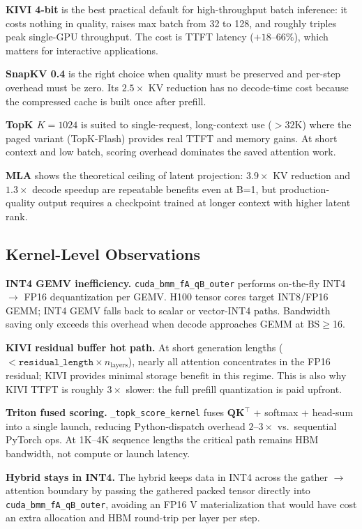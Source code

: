 \documentclass[conference]{IEEEtran}
\begin{document}
\textbf{KIVI 4-bit} is the best practical default for high-throughput
batch inference: it costs nothing in quality, raises max batch from 32
to 128, and roughly triples peak single-GPU throughput.  The cost is
TTFT latency ($+18$--$66\%$), which matters for interactive
applications.

\textbf{SnapKV 0.4} is the right choice when quality must be preserved
and per-step overhead must be zero.  Its $2.5\times$ KV reduction has
no decode-time cost because the compressed cache is built once after
prefill.

\textbf{TopK $K\!=\!1024$} is suited to single-request, long-context
use ($>32$K) where the paged variant (TopK-Flash) provides real TTFT
and memory gains.  At short context and low batch, scoring overhead
dominates the saved attention work.

\textbf{MLA} shows the theoretical ceiling of latent projection:
$3.9\times$ KV reduction and $1.3\times$ decode speedup are repeatable
benefits even at B=1, but production-quality output requires a
checkpoint trained at longer context with higher latent rank.

\subsection{Kernel-Level Observations}

\textbf{INT4 GEMV inefficiency.}  \texttt{cuda\_bmm\_fA\_qB\_outer}
performs on-the-fly INT4 $\rightarrow$ FP16 dequantization per GEMV.
H100 tensor cores target INT8/FP16 GEMM; INT4 GEMV falls back to scalar
or vector-INT4 paths.  Bandwidth saving only exceeds this overhead when
decode approaches GEMM at BS$\geq$16.

\textbf{KIVI residual buffer hot path.}  At short generation lengths
($<\!\texttt{residual\_length}\!\times\!n_\text{layers}$), nearly all
attention concentrates in the FP16 residual; KIVI provides minimal
storage benefit in this regime.  This is also why KIVI TTFT is roughly
$3\times$ slower: the full prefill quantization is paid upfront.

\textbf{Triton fused scoring.}  \texttt{\_topk\_score\_kernel} fuses
$\mathbf{Q}\mathbf{K}^\top$ + softmax + head-sum into a single launch,
reducing Python-dispatch overhead $2$--$3\times$ vs.\ sequential
PyTorch ops.  At 1K--4K sequence lengths the critical path remains HBM
bandwidth, not compute or launch latency.

\textbf{Hybrid stays in INT4.}  The hybrid keeps data in INT4 across
the gather $\rightarrow$ attention boundary by passing the gathered
packed tensor directly into \texttt{cuda\_bmm\_fA\_qB\_outer},
avoiding an FP16 V materialization that would have cost an extra
allocation and HBM round-trip per layer per step.
\end{document}
